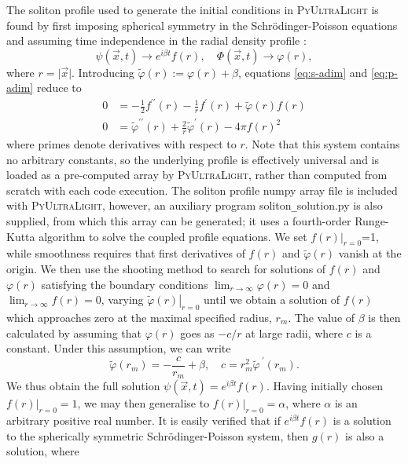 \documentclass[a4paper,11pt]{article}
\newcommand{\PyUltraLight}{\textsc{PyUltraLight}\xspace}
\begin{document}
The soliton profile used to generate the initial conditions in \PyUltraLight is found by first imposing spherical symmetry in the Schr{\"o}dinger-Poisson equations and assuming time independence in the radial density profile \cite{Paredes2016}:
%
\begin{equation}
    \psi(\vec{x},t)\rightarrow e^{i\beta t} f(r), \quad \Phi(\vec{x},t)\rightarrow \varphi(r),
\end{equation}
where $r=\vert\vec{x}\vert$. Introducing $\tilde{\varphi}(r):=\varphi(r)+\beta$, equations \ref{eq:s-adim} and \ref{eq:p-adim}  reduce to
\begin{align}
    0 &= -\frac{1}{2}f^{\prime\prime}(r)-\frac{1}{r}f^\prime(r)+\tilde{\varphi}(r)f(r)\label{eq:s-spherical}\\
    0 &= \tilde{\varphi}^{\prime\prime}(r)+\frac{2}{r}\tilde{\varphi}^\prime(r)-4\pi f(r)^2\label{eq:p-spherical}
\end{align}
%
where primes denote derivatives with respect to $r$. Note that this system contains no arbitrary constants, so the underlying profile is effectively universal and is loaded as a pre-computed array by \PyUltraLight, rather than computed from scratch with each code execution. The soliton profile numpy array file is included with \PyUltraLight, however, an auxiliary program {\sc soliton\texttt{\_}solution.py} is also supplied, from which this array can be generated; it uses a  fourth-order Runge-Kutta algorithm to solve the coupled profile equations. We set $\left. f(r) \right|_{r=0}$=1, while  smoothness requires that first derivatives of $f(r)$ and $\tilde{\varphi}(r)$ vanish at the origin. We then use the shooting method to search for solutions of $f(r)$ and $\varphi(r)$  satisfying the boundary conditions $\lim_{r\rightarrow\infty}\varphi(r)=0$ and $\lim_{r\rightarrow\infty}f(r)=0$, varying $\left. \tilde{\varphi}(r)\right|_{r=0}$ until we obtain a solution of $f(r)$ which approaches zero at the maximal specified radius, $r_m$. The value of $\beta$ is then calculated by assuming that $\varphi(r)$ goes as $-c/r$ at large radii, where $c$ is a constant. Under this assumption, we can write
\begin{equation}
    \tilde{\varphi}(r_m)=-\frac{c}{r_m}+\beta, \quad c=r_m^2\tilde{\varphi}^{\ \prime}(r_m).
\end{equation}
We thus obtain the full solution $\psi(\vec{x},t)=e^{i\beta t}f(r)$.
Having initially chosen $\left. f(r)\right|_{r=0}=1$, we may then generalise to $\left. f(r)\right|_{r=0}=\alpha$, where $\alpha$ is an arbitrary positive real number. It is easily verified that if $e^{i\beta t}f(r)$ is a solution to the spherically symmetric Schr{\"o}dinger-Poisson system, then $g(r)$ is also a solution, where
\end{document}
